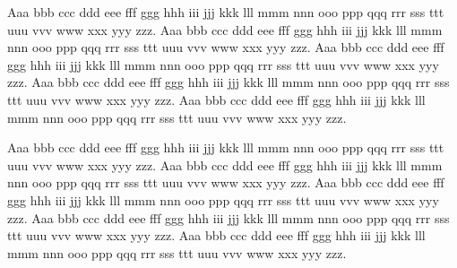 \documentclass{article}
\begin{document}
Aaa bbb ccc ddd eee fff ggg hhh iii jjj kkk lll mmm nnn ooo ppp qqq rrr sss ttt
uuu vvv www xxx yyy zzz. Aaa bbb ccc ddd eee fff ggg hhh iii jjj kkk lll mmm
nnn ooo ppp qqq rrr sss ttt uuu vvv www xxx yyy zzz. Aaa bbb ccc ddd eee fff
ggg hhh iii jjj kkk lll mmm nnn ooo ppp qqq rrr sss ttt uuu vvv www xxx yyy
zzz. Aaa bbb ccc ddd eee fff ggg hhh iii jjj kkk lll mmm nnn ooo ppp qqq rrr
sss ttt uuu vvv www xxx yyy zzz. Aaa bbb ccc ddd eee fff ggg hhh iii jjj kkk
lll mmm nnn ooo ppp qqq rrr sss ttt uuu vvv www xxx yyy zzz.

Aaa bbb ccc ddd eee fff ggg hhh iii jjj kkk lll mmm nnn ooo ppp qqq rrr sss ttt
uuu vvv www xxx yyy zzz. Aaa bbb ccc ddd eee fff ggg hhh iii jjj kkk lll mmm
nnn ooo ppp qqq rrr sss ttt uuu vvv www xxx yyy zzz. Aaa bbb ccc ddd eee fff
ggg hhh iii jjj kkk lll mmm nnn ooo ppp qqq rrr sss ttt uuu vvv www xxx yyy
zzz. Aaa bbb ccc ddd eee fff ggg hhh iii jjj kkk lll mmm nnn ooo ppp qqq rrr
sss ttt uuu vvv www xxx yyy zzz. Aaa bbb ccc ddd eee fff ggg hhh iii jjj kkk
lll mmm nnn ooo ppp qqq rrr sss ttt uuu vvv www xxx yyy zzz.
\end{document}
